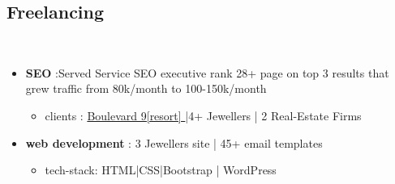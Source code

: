 \documentclass[]{deedy-resume-openfont}
\begin{document}
\subsection{\textbf{Freelancing }}
\\
\begin{itemize}
\item \textbf{SEO} :Served Service SEO executive rank 28+ page on top 3 results that grew traffic from 80k/month to 100-150k/month
\begin{itemize}
\item clients : \href{https://www.boulevard9.in/}{Boulevard 9[resort] } |4+ Jewellers | 2 Real-Estate Firms 
\end{itemize}
\item \textbf{web development} : 3 Jewellers site | 45+  email templates 
\begin{itemize}
\item tech-stack: HTML|CSS|Bootstrap | WordPress 
\end{itemize}
\end{itemize}
\end{document}
